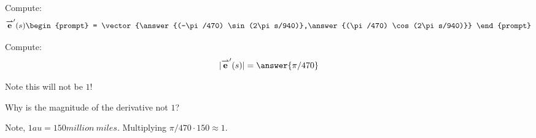 \documentclass{ximera}
\begin{document}
\begin{exercise}
\begin{exercise}
\begin{exercise}
\begin{exercise}
      Compute:
      \[
      \vec{e}'(s)
      \begin{prompt}
        = \vector{\answer{(-\pi/470) \sin(2\pi s/940)},\answer{(\pi/470) \cos(2\pi s/940)}}
      \end{prompt}
      \]
      \begin{exercise}
        Compute:
        \[
        |\vec{e}'(s)| = \answer{\pi/470}
        \]
        \begin{feedback}
          Note this will not be $1$!
        \end{feedback}
        \begin{exercise}
          Why is the magnitude of the derivative not $1$?
          \begin{multipleChoice}
          \end{multipleChoice}
          \begin{feedback}
            Note, $1\unit{au} =
            150\unit{million~miles}$. Multiplying $\pi/470\cdot 150
            \approx 1$.
          \end{feedback}
        \end{exercise}
      \end{exercise}
    \end{exercise}
    \end{exercise}
  \end{exercise}
\end{exercise}
\end{document}
